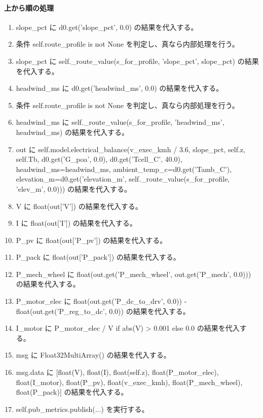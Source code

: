 \documentclass[a4paper,11pt]{article}
\begin{document}
            \paragraph{上から順の処理}
            \begin{enumerate}[leftmargin=1.8em]
            \item slope\_pct に d0.get('slope\_pct', 0.0) の結果を代入する。
\item 条件 self.route\_profile is not None を判定し、真なら内部処理を行う。
\item   slope\_pct に self.\_route\_value(s\_for\_profile, 'slope\_pct', slope\_pct) の結果を代入する。
\item headwind\_ms に d0.get('headwind\_ms', 0.0) の結果を代入する。
\item 条件 self.route\_profile is not None を判定し、真なら内部処理を行う。
\item   headwind\_ms に self.\_route\_value(s\_for\_profile, 'headwind\_ms', headwind\_ms) の結果を代入する。
\item out に self.model.electrical\_balance(v\_exec\_kmh / 3.6, slope\_pct, self.z, self.Tb, d0.get('G\_poa', 0.0), d0.get('Tcell\_C', 40.0), headwind\_ms=headwind\_ms, ambient\_temp\_c=d0.get('Tamb\_C'), elevation\_m=d0.get('elevation\_m', self.\_route\_value(s\_for\_profile, 'elev\_m', 0.0))) の結果を代入する。
\item V に float(out['V']) の結果を代入する。
\item I に float(out['I']) の結果を代入する。
\item P\_pv に float(out['P\_pv']) の結果を代入する。
\item P\_pack に float(out['P\_pack']) の結果を代入する。
\item P\_mech\_wheel に float(out.get('P\_mech\_wheel', out.get('P\_mech', 0.0))) の結果を代入する。
\item P\_motor\_elec に float(out.get('P\_dc\_to\_drv', 0.0)) - float(out.get('P\_reg\_to\_dc', 0.0)) の結果を代入する。
\item I\_motor に P\_motor\_elec / V if abs(V) > 0.001 else 0.0 の結果を代入する。
\item msg に Float32MultiArray() の結果を代入する。
\item msg.data に [float(V), float(I), float(self.z), float(P\_motor\_elec), float(I\_motor), float(P\_pv), float(v\_exec\_kmh), float(P\_mech\_wheel), float(P\_pack)] の結果を代入する。
\item self.pub\_metrics.publish(...) を実行する。
            \end{enumerate}
\end{document}

